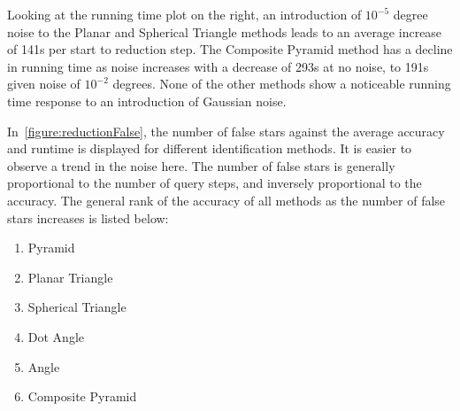 Looking at the running time plot on the right, an introduction of $10^{-5}$ degree noise to the Planar and
Spherical Triangle methods leads to an average increase of 141s per start to reduction step.
The Composite Pyramid method has a decline in running time as noise increases with a decrease of 293s at no noise, to
191s given noise of $10^{-2}$ degrees.
None of the other methods show a noticeable running time response to an introduction of Gaussian noise.

\begin{figure}
\end{figure}

In~\autoref{figure:reductionFalse}, the number of false stars against the average accuracy and runtime is displayed
for different identification methods.
It is easier to observe a trend in the noise here.
The number of false stars is generally proportional to the number of query steps, and inversely proportional
to the accuracy.
The general rank of the accuracy of all methods as the number of false stars increases is listed below:
\begin{multicols}{2}
\begin{enumerate}
    \item Pyramid
    \item Planar Triangle
    \item Spherical Triangle
    \item Dot Angle
    \item Angle
    \item Composite Pyramid
\end{enumerate}
\end{multicols}

